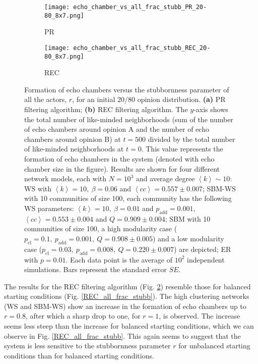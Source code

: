 \documentclass[11 pt , letterpaper , twoside , openright]{book}
\begin{document}
\begin{figure}[H]
  \begin{subfigure}[b]{0.49\textwidth}
    \caption{PR}
  	\texttt{[image: echo\_chamber\_vs\_all\_frac\_stubb\_PR\_20-80\_8x7.png]}
    \label{PR_all_frac_stubb_20-80}
  \end{subfigure}
  \begin{subfigure}[b]{0.49\textwidth}
    \caption{REC}
  	\texttt{[image: echo\_chamber\_vs\_all\_frac\_stubb\_REC\_20-80\_8x7.png]}
    \label{REC_all_frac_stubb_20-80}
  \end{subfigure}
  \captionsetup{format=plain}
  \caption[Formation of echo chambers versus the stubbornness parameter of all the actors, $r$, for the PR and REC filtering algorithms and an initial $20/80$ opinion distribution.]{Formation of echo chambers versus the stubbornness parameter of all the actors, $r$, for an initial $20/80$ opinion distribution. \textbf{(a)} PR filtering algorithm; \textbf{(b)} REC filtering algorithm. The $y$-axis shows the total number of like-minded neighborhoods (sum of the number of echo chambers around opinion A and the number of echo chambers around opinion B) at $t=500$ divided by the total number of like-minded neighborhoods at $t=0$. This value represents the formation of echo chambers in the system (denoted with echo chamber size in the figure). Results are shown for four different network models, each with $N=10^3$ and average degree $\left<k\right> \sim 10$: WS with $\left<k\right> =10,\ \beta = 0.06$ and $\left<cc\right> = 0.557 \pm 0.007$; SBM-WS with 10 communities of size 100, each community has the following WS parameters: $\left<k\right> = 10,\ \beta = 0.01$ and $p_{\text{add}} = 0.001$, $\left<cc\right> = 0.553 \pm 0.004$ and $Q = 0.909 \pm 0.004$; SBM with 10 communities of size 100, a high modularity case ($p_{\text{cl}} = 0.1,\ p_{\text{add}} = 0.001,\ Q = 0.908 \pm 0.005$) and a low modularity case ($p_{\text{cl}} = 0.03,\ p_{\text{add}} = 0.008,\ Q = 0.220 \pm 0.007$) are depicted; ER with $p= 0.01$. Each data point is the average of $10^2$ independent simulations. Bars represent the standard error $SE$.}
\label{echo_vs_all_frac_stubb_PR-REC_20-80}
\end{figure}
\noindent
The results for the REC filtering algorithm (Fig. \ref{REC_all_frac_stubb_20-80}) resemble those for balanced starting conditions (Fig. \ref{REC_all_frac_stubb}). The high clustering networks (WS and SBM-WS) show an increase in the formation of echo chambers up to $r=0.8$, after which a sharp drop to one, for $r=1$, is observed. The increase seems less steep than the increase for balanced starting conditions, which we can observe in Fig. \ref{REC_all_frac_stubb}. This again seems to suggest that the system is less sensitive to the stubbornness parameter $r$ for unbalanced starting conditions than for balanced starting conditions.\\
\end{document}
